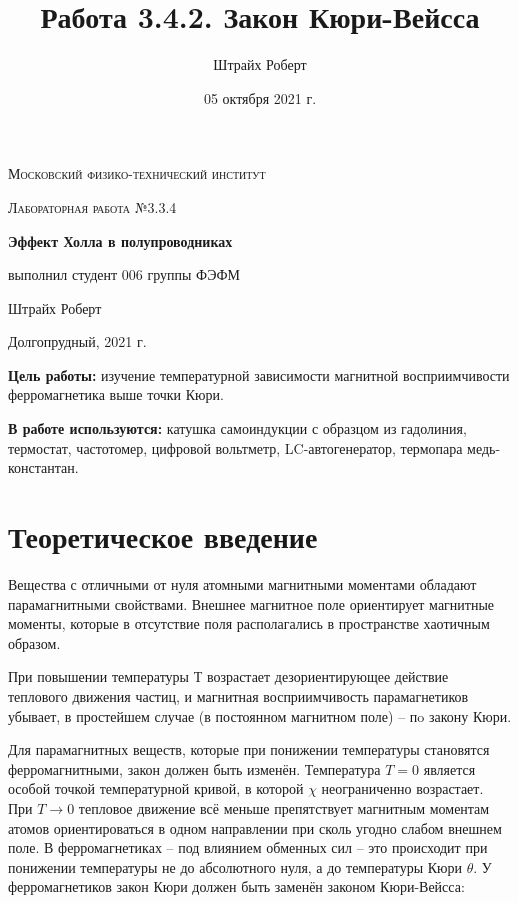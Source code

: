 \documentclass[a4paper, 12pt]{article}
\author{Штрайх Роберт}
\title{Работа 3.4.2. Закон Кюри-Вейсса}
\date{05 октября 2021 г.}
\begin{document}
\begin{titlepage}
	\centering
	\vspace{5cm}
	{\scshape\LARGE Московский физико-технический институт \par}
	\vspace{4cm}
	{\scshape\Large Лабораторная работа №3.3.4 \par}
	\vspace{1cm}
	{\huge\bfseries Эффект Холла в полупроводниках \par}
	\vspace{1cm}
	\vfill
\begin{flushright}
	{\Large выполнил студент 006 группы ФЭФМ}\par
	\vspace{0.3cm}
	{\Large Штрайх Роберт}
\end{flushright}
	

	\vfill

	Долгопрудный, 2021 г.
\end{titlepage}

\newpage

\textbf{Цель работы:} изучение температурной зависимости магнитной восприимчивости ферромагнетика выше точки Кюри.

\textbf{В работе используются:} катушка самоиндукции с образцом из гадолиния, термостат, частотомер, цифровой вольтметр, LC-автогенератор, термопара медь-константан.

\section{Теоретическое введение}

Вещества с отличными от нуля атомными магнитными моментами обладают парамагнитными свойствами. Внешнее магнитное поле ориентирует магнитные моменты, которые в отсутствие поля располагались в пространстве хаотичным образом.

При повышении температуры $ Т $ возрастает дезориентирующее действие теплового движения частиц, и магнитная восприимчивость парамагнетиков
убывает, в простейшем случае (в постоянном магнитном
поле) -- пo закону Кюри.

Для парамагнитных веществ, которые при понижении температуры становятся ферромагнитными, закон должен быть изменён. Температура $T = 0$ является особой точкой температурной кривой, в которой $\chi$ неограниченно возрастает. При $T \to 0$ тепловое движение всё меньше препятствует магнитным моментам атомов ориентироваться в одном направлении при сколь угодно слабом внешнем поле. В ферромагнетиках -- под влиянием обменных сил -- это происходит при понижении температуры не до абсолютного нуля, а до температуры Кюри $\theta$. У ферромагнетиков закон Кюри должен быть заменён законом Кюри-Вейсса:
\end{document}
